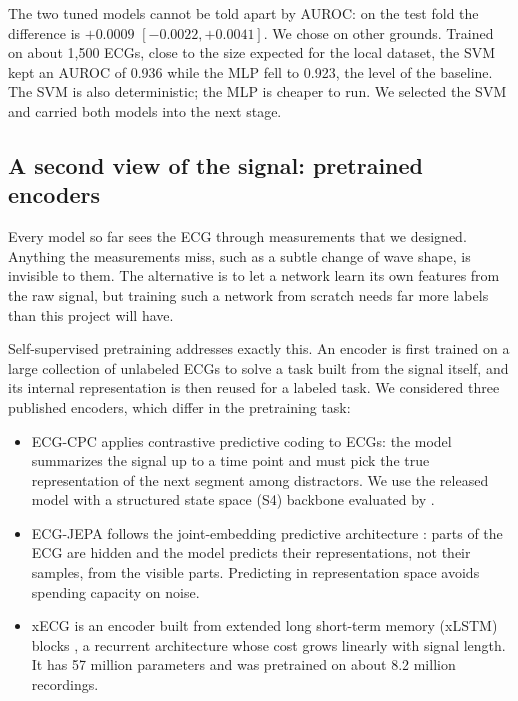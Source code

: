 \documentclass[letterpaper,11pt]{article}
\begin{document}
The two tuned models cannot be told apart by AUROC: on the test fold the difference is $+0.0009$ $[-0.0022, +0.0041]$. We chose on other grounds. Trained on about 1,500 ECGs, close to the size expected for the local dataset, the SVM kept an AUROC of 0.936 while the MLP fell to 0.923, the level of the baseline. The SVM is also deterministic; the MLP is cheaper to run. We selected the SVM and carried both models into the next stage.

\subsection{A second view of the signal: pretrained encoders}

Every model so far sees the ECG through measurements that we designed. Anything the measurements miss, such as a subtle change of wave shape, is invisible to them. The alternative is to let a network learn its own features from the raw signal, but training such a network from scratch needs far more labels than this project will have.

Self-supervised pretraining addresses exactly this. An encoder is first trained on a large collection of unlabeled ECGs to solve a task built from the signal itself, and its internal representation is then reused for a labeled task. We considered three published encoders, which differ in the pretraining task:

\begin{itemize}\setlength{\itemsep}{0pt}\setlength{\parskip}{0pt}
  \item ECG-CPC applies contrastive predictive coding \parencite{vandenoord2018cpc} to ECGs: the model summarizes the signal up to a time point and must pick the true representation of the next segment among distractors. We use the released model with a structured state space (S4) backbone evaluated by \textcite{almasud2025benchmarking}.
  \item ECG-JEPA \parencite{kim2024ecgjepa} follows the joint-embedding predictive architecture \parencite{assran2023ijepa}: parts of the ECG are hidden and the model predicts their representations, not their samples, from the visible parts. Predicting in representation space avoids spending capacity on noise.
  \item xECG \parencite{lunelli2026benchecg} is an encoder built from extended long short-term memory (xLSTM) blocks \parencite{beck2024xlstm}, a recurrent architecture whose cost grows linearly with signal length. It has 57 million parameters and was pretrained on about 8.2 million recordings.
\end{itemize}
\end{document}
